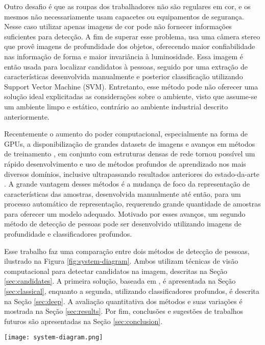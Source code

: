   Outro desafio é que as roupas dos trabalhadores não são regulares em cor, e os mesmos não necessariamente usam capacetes ou equipamentos de segurança. Nesse caso utilizar apenas imagens de cor pode não fornecer informações suficientes para detecção. A fim de superar esse problema, \cite{rauter} usa uma câmera stereo que provê imagens de profundidade dos objetos, oferecendo maior confiabilidade nas informação de forma e maior invariância à luminosidade. Essa imagem é então usada para localizar candidatos à pessoas, seguido por uma extração de características desenvolvida manualmente e posterior classificação utilizando Support Vector Machine (SVM). Entretanto, esse método pode não oferecer uma solução ideal explicitadas as considerações sobre o ambiente, visto que assume-se um ambiente limpo e estático, contrário ao ambiente industrial descrito anteriormente.

  Recentemente o aumento do poder computacional, especialmente na forma de GPUs, a disponibilização de grandes datasets de imagens e avanços em métodos de treinamento \cite{nair2010relu}, em conjunto com estruturas densas de rede \cite{NIPS2013_5207} tornou possível um rápido desenvolvimento e uso de métodos profundos de aprendizado nos mais diversos domínios, inclusive ultrapassando resultados anteriores do estado-da-arte \cite{hintonCONVNET}. A grande vantagem desses métodos é a mudança de foco da representação de características das amostras, desenvolvida manualmente até então, para um processo automático de representação, requerendo grande quantidade de amostras para oferecer um modelo adequado. Motivado por esses avanços, um segundo método de detecção de pessoas pode ser desenvolvido utilizando imagens de profundidade e classificadores profundos.

  Esse trabalho faz uma comparação entre dois métodos de detecção de pessoas, ilustrado na Figura \ref{fig:system-diagram}. Ambos utilizam técnicas de visão computacional para detectar candidatos na imagem, descritas na Seção \ref{sec:candidates}. A primeira solução, baseada em \cite{rauter}, é apresentada na Seção \ref{sec:classical}, enquanto a segunda, utilizando classificadores profundos, é descrita na Seção \ref{sec:deep}. A avaliação quantitativa dos métodos e suas variações é mostrada na Seção \ref{sec:results}. Por fim, conclusões e sugestões de trabalhos futuros são apresentadas na Seção \ref{sec:conclusion}.

  \begin{figure*}[!t]
  \centering
  \texttt{[image: system-diagram.png]}
  \caption{Diagrama do sistema de detecção de pessoas.}
  \label{fig:system-diagram}
  \end{figure*}

